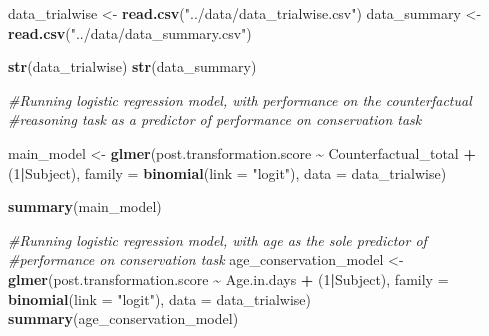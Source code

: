\documentclass[
  doc]{apa6}
\newenvironment{Shaded}{\begin{snugshade}}{\end{snugshade}}
\newcommand{\AttributeTok}[1]{\textcolor[rgb]{0.13,0.29,0.53}{#1}}
\newcommand{\CommentTok}[1]{\textcolor[rgb]{0.56,0.35,0.01}{\textit{#1}}}
\newcommand{\DecValTok}[1]{\textcolor[rgb]{0.00,0.00,0.81}{#1}}
\newcommand{\FunctionTok}[1]{\textcolor[rgb]{0.13,0.29,0.53}{\textbf{#1}}}
\newcommand{\NormalTok}[1]{#1}
\newcommand{\OtherTok}[1]{\textcolor[rgb]{0.56,0.35,0.01}{#1}}
\newcommand{\SpecialCharTok}[1]{\textcolor[rgb]{0.81,0.36,0.00}{\textbf{#1}}}
\newcommand{\StringTok}[1]{\textcolor[rgb]{0.31,0.60,0.02}{#1}}
\begin{document}
\begin{Shaded}
\begin{Highlighting}[]
\NormalTok{data\_trialwise }\OtherTok{\textless{}{-}} \FunctionTok{read.csv}\NormalTok{(}\StringTok{"../data/data\_trialwise.csv"}\NormalTok{)}
\NormalTok{data\_summary }\OtherTok{\textless{}{-}} \FunctionTok{read.csv}\NormalTok{(}\StringTok{"../data/data\_summary.csv"}\NormalTok{)}

\FunctionTok{str}\NormalTok{(data\_trialwise)}
\FunctionTok{str}\NormalTok{(data\_summary)}
\end{Highlighting}
\end{Shaded}

\begin{Shaded}
\begin{Highlighting}[]
\CommentTok{\#Running logistic regression model, with performance on the counterfactual }
\CommentTok{\#reasoning task as a predictor of performance on conservation task}

\NormalTok{main\_model }\OtherTok{\textless{}{-}} \FunctionTok{glmer}\NormalTok{(post.transformation.score }\SpecialCharTok{\textasciitilde{}}\NormalTok{ Counterfactual\_total }\SpecialCharTok{+} 
\NormalTok{                      (}\DecValTok{1}\SpecialCharTok{|}\NormalTok{Subject), }\AttributeTok{family =} \FunctionTok{binomial}\NormalTok{(}\AttributeTok{link =} \StringTok{"logit"}\NormalTok{), }
                    \AttributeTok{data =}\NormalTok{ data\_trialwise)}

\FunctionTok{summary}\NormalTok{(main\_model)}
\end{Highlighting}
\end{Shaded}

\begin{Shaded}
\begin{Highlighting}[]
\CommentTok{\#Running logistic regression model, with age as the sole predictor of }
\CommentTok{\#performance on conservation task}
\NormalTok{age\_conservation\_model }\OtherTok{\textless{}{-}} \FunctionTok{glmer}\NormalTok{(post.transformation.score }\SpecialCharTok{\textasciitilde{}}\NormalTok{ Age.in.days }\SpecialCharTok{+} 
\NormalTok{                                  (}\DecValTok{1}\SpecialCharTok{|}\NormalTok{Subject),}
                \AttributeTok{family =} \FunctionTok{binomial}\NormalTok{(}\AttributeTok{link =} \StringTok{"logit"}\NormalTok{),}
                \AttributeTok{data =}\NormalTok{ data\_trialwise)}
\FunctionTok{summary}\NormalTok{(age\_conservation\_model)}
\end{Highlighting}
\end{Shaded}
\end{document}

